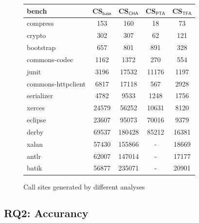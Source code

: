 \documentclass{llncs}
\begin{document}
\begin{figure}[t!]
  \centering
\begin{tabular}{lcccc}
	\hline
	\textbf{bench} & \textbf{CS$_{\textsf{base}}$} &\hspace{5pt} \textbf{CS$_{\textsf{CHA}}$}\hspace{5pt} &\hspace{5pt} \textbf{CS$_{\textsf{PTA}}$}\hspace{5pt} & \hspace{5pt} \textbf{CS$_{\textsf{TFA}}$}\hspace{5pt} \\
	\hline
	compress & 153 & 160 & 18 & 73 \\
	crypto & 302 & 307 & 62 & 121 \\
	bootstrap & 657 & 801 & 891 & 328 \\
	commons-codec & 1162 & 1372 & 270 & 554 \\
	junit & 3196 & 17532 & 11176 & 1197 \\
	commons-httpclient & 6817 & 17118 & 567 & 2928 \\
	serializer & 4782 & 9533 & 1248 & 1756 \\
	xerces & 24579 & 56252 & 10631 & 8120 \\
	eclipse & 23607 & 95073 & 70016 & 9379 \\
	derby & 69537 & 180428 & 85212 & 16381 \\
	xalan & 57430 & 155866 & - & 18669 \\
	antlr & 62007 & 147014 & - & 17177 \\
	batik & 56877 & 235071 & - & 20901 \\
	\hline
\end{tabular}
\caption{Call sites generated by different analyses}
\label{experiment:Callsite}
\end{figure}

\subsection{RQ2: Accurancy}\label{subsec:accurancy}
\end{document}

